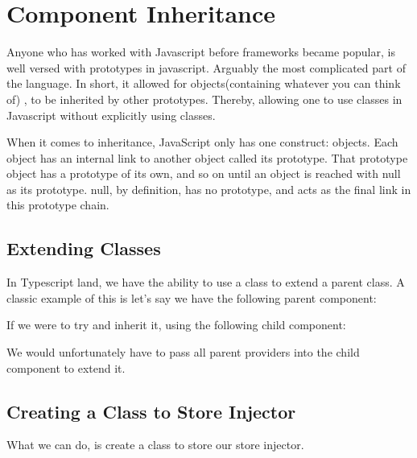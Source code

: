 \maketitle{}
\section{ Component Inheritance }

Anyone who has worked with Javascript before frameworks became popular, is well
versed with prototypes in javascript. Arguably the most complicated part of the
language. In short, it allowed for objects(containing whatever you can think of)
, to be inherited by other prototypes. Thereby, allowing one to use classes in
Javascript without explicitly using classes.

When it comes to inheritance, JavaScript only has one construct: objects.
Each object has an internal link to another object called its prototype. That
prototype object has a prototype of its own, and so on until an object is
reached with null as its prototype. null, by definition, has no prototype, and
acts as the final link in this prototype chain.

\subsection{ Extending Classes }
In Typescript land, we have the ability to use a class to extend a parent class.
A classic example of this is let's say we have the following parent component:



If we were to try and inherit it, using the following child component:



We would unfortunately have to pass all parent providers into the child
component to extend it.

\subsection{ Creating a Class to Store Injector }
What we can do, is create a class to store our store injector. 
